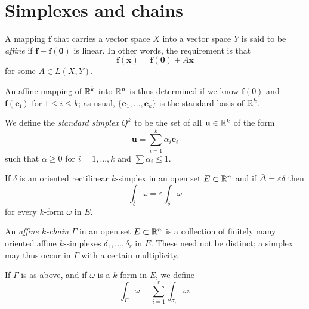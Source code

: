 
\section{Simplexes and chains}

\begin{myDef}
    A mapping $\mathbf{f}$ that carries a vector space $X$ into a
    vector space $Y$ is said to be \emph{affine} if $\mathbf{f - f(0)}$ is linear. 
    In other words, the requirement is that
    \begin{equation}
        \label{eq:10.73}
        \mathbf{f(x)} = 
        \mathbf{f(0)} + A \mathbf{x}
    \end{equation}
    for some $A \in L(X, Y)$.

    An affine mapping of ${\protect\mathbb R}^k$ into ${\protect\mathbb R}^n$ is thus determined if we know $\mathbf{f}(0)$ and $\mathbf{f(e_i)}$ for $1 \leq i \leq k$; 
    as usual, $\{\mathbf{e}_1, ... , \mathbf{e}_k\}$ is the standard basis of ${\protect\mathbb R}^k$.
    
    We define the \emph{standard simplex} $Q^k$ to be the set of all $\mathbf{u} \in {\protect\mathbb R}^k$ of the form
    \begin{equation}
        \label{eq;10.74}
        \mathbf{u} = \sum_{i=1}^{k} \alpha_i \mathbf{e}_i
    \end{equation}
    such that $\alpha \geq 0$ for $i = 1, ... , k$ and $\sum \alpha_i \leq 1$.
\end{myDef}

\begin{thm}
    \label{thm:10.27}
    If $\delta$ is an oriented rectilinear $k$-simplex in an open set $E \subset {\protect\mathbb R}^n$ 
    and if $\bar{\Delta} = \varepsilon \delta$ then
    \begin{equation}
        \label{eq:10.81}
        \int_{\bar{\delta}} \omega = 
        \varepsilon \int_{\delta} \omega 
    \end{equation}
    for every $k$-form $\omega$ in $E$.
\end{thm}


\begin{myDef}
    An \emph{affine $k$-chain} $\Gamma$ in an open set $E \subset {\protect\mathbb R}^n$ is a collection of finitely many oriented affine $k$-simplexes $\delta_1, \dots, \delta_r$ in $E$. 
    These need not be distinct; 
    a simplex may thus occur in $\Gamma$ with a certain multiplicity.

    If $\Gamma$ is as above, and if $\omega$ is a $k$-form in $E$,
    we define 
    \begin{equation}
        \label{eq:10.82}
        \int_{\Gamma} \omega =
        \sum_{i=1}^{r} \int_{\sigma_i} \omega .
    \end{equation}
\end{myDef}

